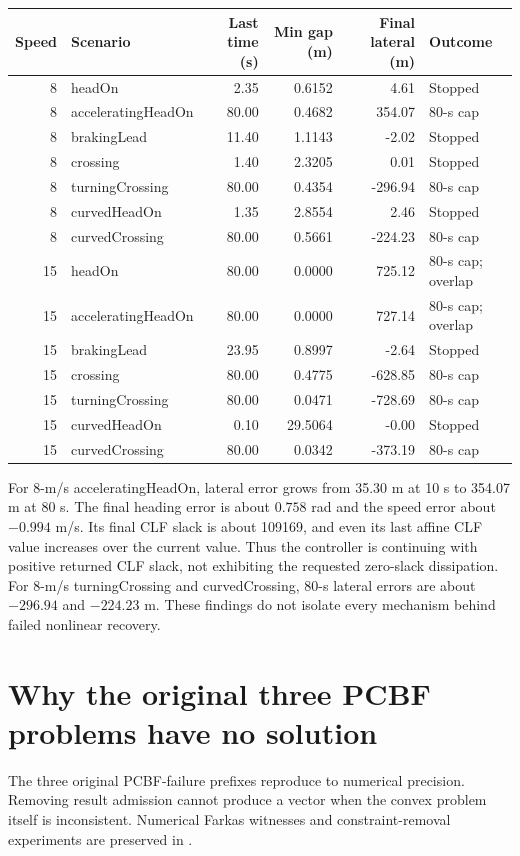\documentclass[11pt]{article}
\begin{document}
\begin{center}\small
\begin{tabular}{r l r r r l}
\toprule
Speed & Scenario & Last time (s) & Min gap (m) & Final lateral (m) & Outcome\\
\midrule
8 & headOn & 2.35 & 0.6152 & 4.61 & Stopped \\
8 & acceleratingHeadOn & 80.00 & 0.4682 & 354.07 & 80-s cap \\
8 & brakingLead & 11.40 & 1.1143 & -2.02 & Stopped \\
8 & crossing & 1.40 & 2.3205 & 0.01 & Stopped \\
8 & turningCrossing & 80.00 & 0.4354 & -296.94 & 80-s cap \\
8 & curvedHeadOn & 1.35 & 2.8554 & 2.46 & Stopped \\
8 & curvedCrossing & 80.00 & 0.5661 & -224.23 & 80-s cap \\
15 & headOn & 80.00 & 0.0000 & 725.12 & 80-s cap; overlap \\
15 & acceleratingHeadOn & 80.00 & 0.0000 & 727.14 & 80-s cap; overlap \\
15 & brakingLead & 23.95 & 0.8997 & -2.64 & Stopped \\
15 & crossing & 80.00 & 0.4775 & -628.85 & 80-s cap \\
15 & turningCrossing & 80.00 & 0.0471 & -728.69 & 80-s cap \\
15 & curvedHeadOn & 0.10 & 29.5064 & -0.00 & Stopped \\
15 & curvedCrossing & 80.00 & 0.0342 & -373.19 & 80-s cap \\
\bottomrule
\end{tabular}\end{center}

For 8-m/s acceleratingHeadOn, lateral error grows from 35.30 m at 10 s to
354.07 m at 80 s. The final heading error is about $0.758$ rad and the speed
error about $-0.994$ m/s. Its final CLF slack is about 109169, and even its
last affine CLF value increases over the current value. Thus the controller
is continuing with positive returned CLF slack, not exhibiting the
requested zero-slack dissipation. For 8-m/s turningCrossing and curvedCrossing,
80-s lateral errors are about $-296.94$ and $-224.23$ m. These findings do not
isolate every mechanism behind failed nonlinear recovery.

\section{Why the original three PCBF problems have no solution}
The three original PCBF-failure prefixes reproduce to numerical precision.
Removing result admission cannot produce a vector when the convex problem
itself is inconsistent. Numerical Farkas witnesses and constraint-removal
experiments are preserved in
.
\end{document}
